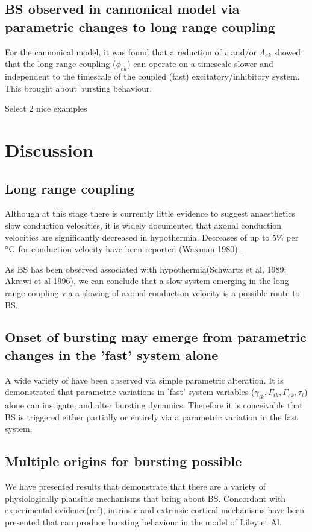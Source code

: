\documentclass[a4paper,12pt]{article}
\begin{document}
\subsection{BS observed in cannonical model via parametric changes to long range coupling}
For the cannonical model, it was found that a reduction of $v$ and/or $\Lambda_{ek}$ showed that the long range coupling
($\phi_{ek}$) can operate on a timescale slower and independent to the timescale of the coupled (fast)
excitatory/inhibitory system. This brought about bursting behaviour.

Select 2 nice examples


\section{Discussion}

\subsection{Long range coupling}
Although at this stage there is currently little evidence to suggest anaesthetics slow conduction velocities, it is
widely documented that axonal conduction velocities are significantly decreased in hypothermia. Decreases of up to 5\%
per $^{\circ}{\rm C}$ for conduction velocity have been reported (Waxman 1980) .

As BS has been observed associated with hypothermia(Schwartz et al, 1989; Akrawi et al 1996), we can conclude that  a slow system emerging in the long range coupling via a slowing of axonal conduction velocity is a possible route
to BS.

\subsection{Onset of bursting may emerge from parametric changes in the 'fast' system alone}
A wide variety of have been observed via simple parametric alteration. It is demonstrated that parametric variations in
'fast' system variables ($\gamma_{ik}, \Gamma_{ik}, \Gamma_{ek}, \tau_i$) alone can instigate, and alter bursting
dynamics. Therefore it is conceivable that BS is triggered either partially or entirely via a parametric variation in the fast system.

\subsection{Multiple origins for bursting possible}
We have presented results that demonstrate that there are a variety of physiologically plausible mechanisms that bring about
BS. Concordant with experimental evidence(ref), intrinsic and extrinsic cortical mechanisms have been
presented that can produce bursting behaviour in the model of Liley et Al.
\end{document}
